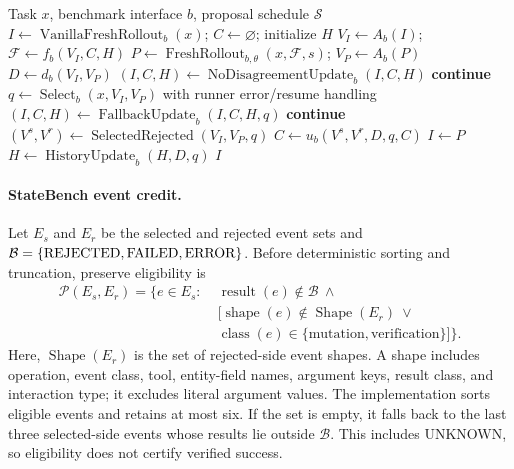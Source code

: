 \documentclass{article}
\newcommand{\api}[1]{\textnormal{#1}}
\begin{document}
\begin{algorithm}[H]
\caption{RISE: Recovery-Informed Scaling via Events}
\label{alg:rise}
\small
\begin{algorithmic}[1]
\Require Task $x$, benchmark interface $b$, proposal schedule $\mathcal{S}$
\State $I\gets\operatorname{VanillaFreshRollout}_b(x)$; $C\gets\varnothing$; initialize $H$
  \State $V_I\gets A_b(I)$; $\mathcal{F}\gets f_b(V_I,C,H)$
  \State $P\gets\operatorname{FreshRollout}_{b,\theta}(x,\mathcal{F},s)$; $V_P\gets A_b(P)$
  \State $D\gets d_b(V_I,V_P)$
    \State $(I,C,H)\gets\operatorname{NoDisagreementUpdate}_b(I,C,H)$
    \State \textbf{continue}
  \EndIf
  \State $q\gets\operatorname{Select}_b(x,V_I,V_P)$ with runner error/resume handling
    \State $(I,C,H)\gets\operatorname{FallbackUpdate}_b(I,C,H,q)$
    \State \textbf{continue}
  \EndIf
  \State $(V^s,V^r)\gets\operatorname{SelectedRejected}(V_I,V_P,q)$
  \State $C\gets u_b(V^s,V^r,D,q,C)$
   \State $I\gets P$ \EndIf
  \State $H\gets\operatorname{HistoryUpdate}_b(H,D,q)$
\EndFor
\State \Return $I$
\end{algorithmic}
\end{algorithm}

\paragraph{StateBench event credit.}
Let $E_s$ and $E_r$ be the selected and rejected event sets and $\mathcal{B}=\{\api{REJECTED},\api{FAILED},\api{ERROR}\}$. Before deterministic sorting and truncation, preserve eligibility is
\begin{equation}
\begin{split}
\mathcal{P}(E_s,E_r)=\{e\in E_s:\;&\operatorname{result}(e)\notin\mathcal{B}\ \land\\
&[\operatorname{shape}(e)\notin\operatorname{Shape}(E_r)\ \lor\\
&\operatorname{class}(e)\in\{\mathrm{mutation},\mathrm{verification}\}]\}.
\end{split}
\label{eq:preserve}
\end{equation}
Here, $\operatorname{Shape}(E_r)$ is the set of rejected-side event shapes. A shape includes operation, event class, tool, entity-field names, argument keys, result class, and interaction type; it excludes literal argument values. The implementation sorts eligible events and retains at most six. If the set is empty, it falls back to the last three selected-side events whose results lie outside $\mathcal{B}$. This includes \api{UNKNOWN}, so eligibility does not certify verified success.
\end{document}
